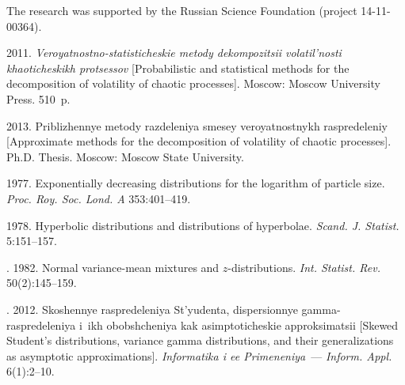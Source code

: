\smallskip



\Ack
\noindent
The research was supported by the Russian Science Foundation (project 14-11-00364).


  \begin{multicols}{2}

\renewcommand{\bibname}{\protect\rmfamily References}



{\small\frenchspacing
 {%
 \begin{thebibliography}{99}
  2011.
\textit{Veroyatnostno-statisticheskie metody dekompozitsii
volatil'nosti khaoticheskikh protsessov}
[Probabilistic and statistical methods for the decomposition of volatility
of chaotic processes].
Moscow: Moscow University Press. 510~p.

 2013.
{Priblizhennye metody razdeleniya smesey veroyatnostnykh raspredeleniy}
[Approximate methods for the decomposition of volatility of chaotic processes].
Ph.D. Thesis. Moscow: Moscow State University.

 1977.
Exponentially decreasing distributions for the logarithm of particle size.
\textit{Proc. Roy. Soc. Lond. A} 353:401--419.

 1978.
Hyperbolic distributions and distributions of hyperbolae.
\textit{Scand. J. Statist.} 5:151--157.

. 1982.
Normal variance-mean mixtures and $z$-distributions.
\textit{Int. Statist. Rev.} 50(2):145--159.

. 2012.
{Skoshennye raspredeleniya St'yudenta, dispersionnye
gam\-ma-ras\-pre\-de\-le\-niya i~ikh obobshcheniya kak asimptoticheskie
approksimatsii}
[Skewed Student's distributions, variance gamma distributions, and their
generalizations as asymptotic approximations].
\textit{Informatika i ee Primeneniya}~--- \textit{Inform. Appl.} 6(1):2--10.


\end{thebibliography}}}
\end{multicols}
